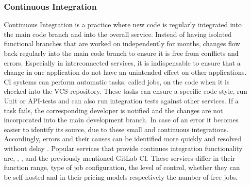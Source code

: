 \documentclass[12pt, a4paper]{article}
\begin{document}
        \subsubsection{Continuous Integration}
        Continuous Integration is a practice where new code is regularly integrated into the main code branch and into the overall service. Instead of having isolated functional branches that are worked on independently for months, changes flow back regularly into the main code branch to ensure it is free from conflicts and errors. Especially in interconnected services, it is indispensable to ensure that a change in one application do not have an unintended effect on other applications. \ac{CI} systems can perform automatic tasks, called jobs, on the code when it is checked into the \ac{VCS} repository. These tasks can ensure a specific code-style, run Unit or \acs{API}-tests and can also run integration tests against other services. If a task fails, the corresponding developer is notified and the changes are not incorporated into the main development branch. In case of an error it becomes easier to identify its source, due to these small and continuous integrations. Accordingly, errors and their causes can be identified more quickly and resolved without delay \cite{azuredevops}.\newline
        Popular services that provide continues integration functionality are, , ,  and the previously mentioned GitLab \ac{CI}. These services differ in their function range, type of job configuration, the level of control, whether they can be self-hosted and in their pricing models respectively the number of free jobs.
\end{document}
